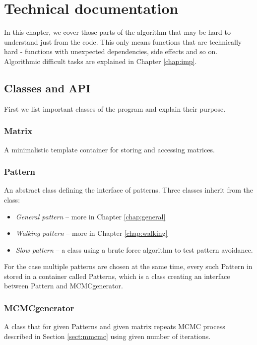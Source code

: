 \chapter{Technical documentation}
\label{chap:tdoc}
In this chapter, we cover those parts of the algorithm that may be hard to understand just from the code. This only means functions that are technically hard - functions with unexpected dependencies, side effects and so on. Algorithmic difficult tasks are explained in Chapter \ref{chap:imp}.

\section{Classes and API}
First we list important classes of the program and explain their purpose.

\subsection{Matrix}
A minimalistic template container for storing and accessing matrices.

\subsection{Pattern}
An abstract class defining the interface of patterns. Three classes inherit from the class:
\begin{itemize}
\item \emph{General pattern} -- more in Chapter \ref{chap:general}
\item \emph{Walking pattern} -- more in Chapter \ref{chap:walking}
\item \emph{Slow pattern} -- a class using a brute force algorithm to test pattern avoidance.
\end{itemize}

For the case multiple patterns are chosen at the same time, every such Pattern in stored in a container called Patterns, which is a class creating an interface between Pattern and MCMCgenerator.

\subsection{MCMCgenerator}
A class that for given Patterns and given matrix repeats MCMC process described in Section \ref{sect:mmcmc} using given number of iterations.

